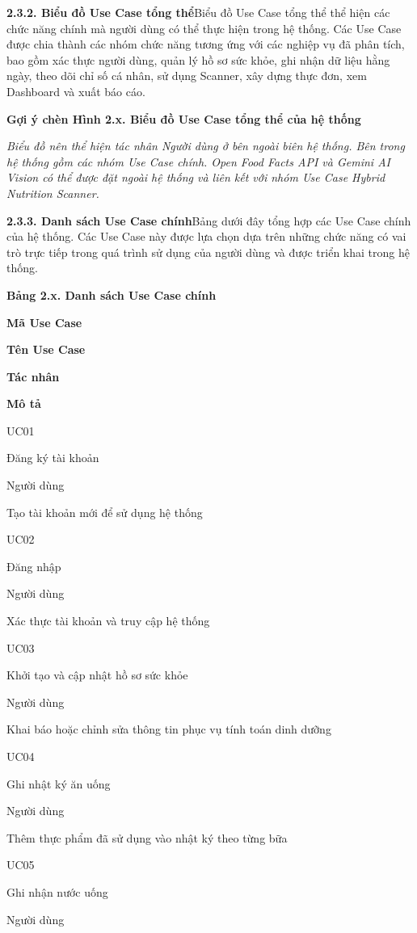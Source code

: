 \textbf{2.3.2. Biểu đồ Use Case tổng thể}Biểu đồ Use Case tổng thể thể hiện các chức năng chính mà người dùng có thể thực hiện trong hệ thống. Các Use Case được chia thành các nhóm chức năng tương ứng với các nghiệp vụ đã phân tích, bao gồm xác thực người dùng, quản lý hồ sơ sức khỏe, ghi nhận dữ liệu hằng ngày, theo dõi chỉ số cá nhân, sử dụng Scanner, xây dựng thực đơn, xem Dashboard và xuất báo cáo.

\textbf{Gợi ý chèn Hình 2.x. Biểu đồ Use Case tổng thể của hệ thống}

\textit{Biểu đồ nên thể hiện tác nhân Người dùng ở bên ngoài biên hệ thống. Bên trong hệ thống gồm các nhóm Use Case chính. Open Food Facts API và Gemini AI Vision có thể được đặt ngoài hệ thống và liên kết với nhóm Use Case Hybrid Nutrition Scanner.}

\textbf{2.3.3. Danh sách Use Case chính}Bảng dưới đây tổng hợp các Use Case chính của hệ thống. Các Use Case này được lựa chọn dựa trên những chức năng có vai trò trực tiếp trong quá trình sử dụng của người dùng và được triển khai trong hệ thống.

\textbf{Bảng 2.x. Danh sách Use Case chính}

\textbf{Mã Use Case}

\textbf{Tên Use Case}

\textbf{Tác nhân}

\textbf{Mô tả}

UC01

Đăng ký tài khoản

Người dùng

Tạo tài khoản mới để sử dụng hệ thống

UC02

Đăng nhập

Người dùng

Xác thực tài khoản và truy cập hệ thống

UC03

Khởi tạo và cập nhật hồ sơ sức khỏe

Người dùng

Khai báo hoặc chỉnh sửa thông tin phục vụ tính toán dinh dưỡng

UC04

Ghi nhật ký ăn uống

Người dùng

Thêm thực phẩm đã sử dụng vào nhật ký theo từng bữa

UC05

Ghi nhận nước uống

Người dùng

